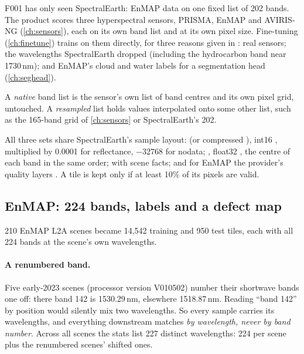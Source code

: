 F001 has only seen SpectralEarth: EnMAP data on one fixed list of 202 bands. The product scores three hyperspectral sensors,
PRISMA, EnMAP and AVIRIS-NG (\cref{ch:sensors}), each on its own band list and at its own pixel size. Fine-tuning
(\cref{ch:finetune}) trains on them directly, for three reasons given in
: real sensors; the wavelengths SpectralEarth dropped (including the
hydrocarbon band near 1730\,nm); and EnMAP's cloud and water labels for a segmentation head (\cref{ch:seghead}).

\begin{definition}
A \emph{native} band list is the sensor's own list of band centres and its own pixel grid, untouched. A \emph{resampled} list
holds values interpolated onto some other list, such as the 165-band grid of \cref{ch:sensors} or SpectralEarth's 202.
\end{definition}

All three sets share SpectralEarth's sample layout:  (or compressed ), int16
, multiplied by 0.0001 for reflectance, $-32768$ for nodata; , float32
, the centre of each band in the same order;  with scene facts; and for EnMAP the provider's
quality layers . A tile is kept only if at least 10\% of its pixels are valid.


\subsection{EnMAP: 224 bands, labels and a defect map}

210 EnMAP L2A scenes became 14,542 training and 950 test tiles, each with all 224 bands at the scene's own
wavelengths.\tbrk{}

\paragraph{A renumbered band.} Five early-2023 scenes (processor version V010502) number their shortwave bands one off: there
band 142 is 1530.29\,nm, elsewhere 1518.87\,nm. Reading ``band 142'' by position would silently mix two wavelengths. So every
sample carries its wavelengths, and everything downstream matches \emph{by wavelength, never by band number}. Across all scenes
the stats list 227 distinct wavelengths: 224 per scene plus the renumbered scenes' shifted ones.

